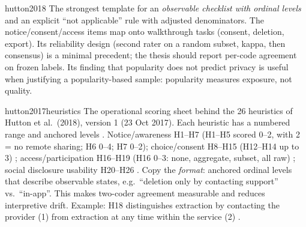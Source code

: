 \begin{papercard}{hutton2018}
 The strongest template for an \emph{observable checklist with ordinal levels} and an explicit ``not applicable'' rule with adjusted denominators. The notice/consent/access items map onto walkthrough tasks (consent, deletion, export). Its reliability design (second rater on a random subset, kappa, then consensus) is a minimal precedent; the thesis should report per-code agreement on frozen labels. Its finding that popularity does not predict privacy is useful when justifying a popularity-based sample: popularity measures exposure, not quality.
\end{papercard}

\begin{papercard}{hutton2017heuristics}
 The operational scoring sheet behind the 26 heuristics of Hutton et al.\ (2018), version 1 (23 Oct 2017). Each heuristic has a numbered range and anchored levels .
 Notice/awareness H1--H7 (H1--H5 scored 0--2, with 2 = no remote sharing; H6 0--4; H7 0--2); choice/consent H8--H15 (H12--H14 up to 3) ; access/participation H16--H19 (H16 0--3: none, aggregate, subset, all raw) ; social disclosure usability H20--H26 .
 Copy the \emph{format}: anchored ordinal levels that describe observable states, e.g.\ ``deletion only by contacting support'' vs.\ ``in-app''. This makes two-coder agreement measurable and reduces interpretive drift. Example: H18 distinguishes extraction by contacting the provider (1) from extraction at any time within the service (2) .
\end{papercard}
